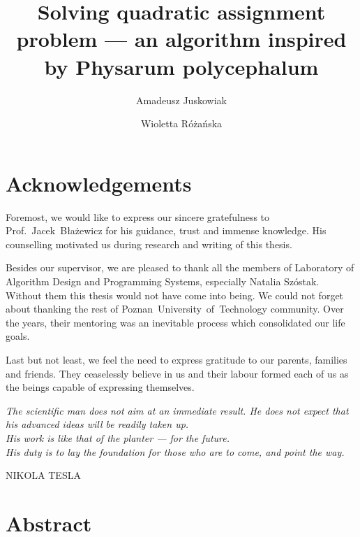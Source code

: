 \documentclass[english,a4paper,twoside]{ppfcmthesis}
\author{
   Amadeusz Juskowiak \album{106453} \and
   Wioletta Różańska \album{106651}}
\title{Solving quadratic assignment problem --– an algorithm inspired by Physarum polycephalum}
\newlength\longest
\begin{document}
\graphicspath{{figures/}}
\frontmatter\pagestyle{empty}%
\maketitle\cleardoublepage%


\cleardoublepage


\chapter*{Acknowledgements}

Foremost, we would like to express our sincere gratefulness to Prof.~Jacek~Błażewicz for his guidance, trust and immense knowledge. His counselling motivated us during research and writing of this thesis.

Besides our supervisor, we are pleased to thank all the members of Laboratory of Algorithm Design and Programming Systems, especially Natalia Szóstak. Without them this thesis would not have come into being. We could not forget about thanking the rest of Poznan~University~of~Technology community. Over the years, their mentoring was an inevitable process which consolidated our life goals. 

Last but not least, we feel the need to express gratitude to our parents, families and friends. They ceaselessly believe in us and their labour formed each of us as the beings capable of expressing themselves.


{
\null\vfill\hfill
\settowidth{}
\centering
\parbox{\longest}{%
  \raggedright{\itshape%
  The scientific man does not aim
  at an immediate result. He does not
  expect that his advanced ideas
  will be readily taken up. \\
  \vspace{\baselineskip}
  His work is like that of the planter --- for the future. \\ 
  His duty is to lay the foundation for those who are to come, and point the way.\par\bigskip
  }   
  \raggedleft\MakeUppercase{Nikola Tesla}\par%
}
}
\cleardoublepage
\chapter*{Abstract}
\end{document}
